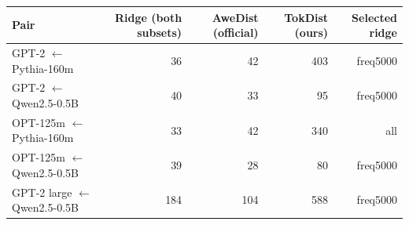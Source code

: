 \begin{tabular}{lrrrr}
\toprule
Pair & Ridge (both subsets) & AweDist (official) & TokDist (ours) & Selected ridge \\
\midrule
GPT-2 $\leftarrow$ Pythia-160m & 36 & 42 & 403 & freq5000 \\
GPT-2 $\leftarrow$ Qwen2.5-0.5B & 40 & 33 & 95 & freq5000 \\
OPT-125m $\leftarrow$ Pythia-160m & 33 & 42 & 340 & all \\
OPT-125m $\leftarrow$ Qwen2.5-0.5B & 39 & 28 & 80 & freq5000 \\
GPT-2 large $\leftarrow$ Qwen2.5-0.5B & 184 & 104 & 588 & freq5000 \\
\bottomrule
\end{tabular}
